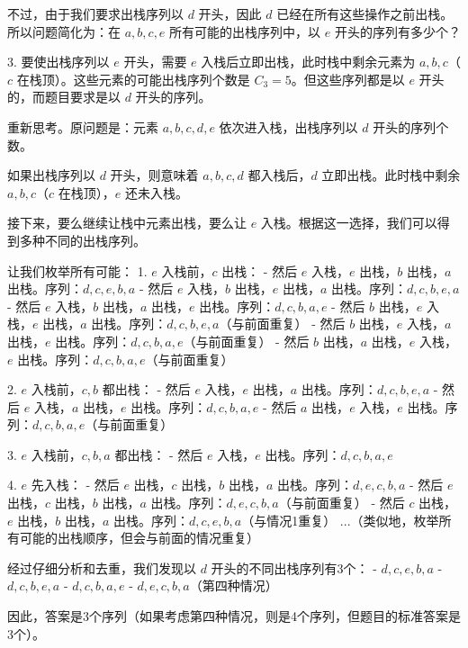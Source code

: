 \documentclass[lang=cn,newtx,10pt,scheme=chinese]{../../../elegantbook}
\begin{document}
\begin{enumerate}
       不过，由于我们要求出栈序列以 $d$ 开头，因此 $d$ 已经在所有这些操作之前出栈。所以问题简化为：在 $a, b, c, e$ 所有可能的出栈序列中，以 $e$ 开头的序列有多少个？

    3. 要使出栈序列以 $e$ 开头，需要 $e$ 入栈后立即出栈，此时栈中剩余元素为 $a, b, c$（$c$ 在栈顶）。这些元素的可能出栈序列个数是 $C_3 = 5$。但这些序列都是以 $e$ 开头的，而题目要求是以 $d$ 开头的序列。

    重新思考。原问题是：元素 $a, b, c, d, e$ 依次进入栈，出栈序列以 $d$ 开头的序列个数。

    如果出栈序列以 $d$ 开头，则意味着 $a, b, c, d$ 都入栈后，$d$ 立即出栈。此时栈中剩余 $a, b, c$（$c$ 在栈顶），$e$ 还未入栈。

    接下来，要么继续让栈中元素出栈，要么让 $e$ 入栈。根据这一选择，我们可以得到多种不同的出栈序列。

    让我们枚举所有可能：
    1. $e$ 入栈前，$c$ 出栈：
       - 然后 $e$ 入栈，$e$ 出栈，$b$ 出栈，$a$ 出栈。序列：$d, c, e, b, a$
       - 然后 $e$ 入栈，$b$ 出栈，$e$ 出栈，$a$ 出栈。序列：$d, c, b, e, a$
       - 然后 $e$ 入栈，$b$ 出栈，$a$ 出栈，$e$ 出栈。序列：$d, c, b, a, e$
       - 然后 $b$ 出栈，$e$ 入栈，$e$ 出栈，$a$ 出栈。序列：$d, c, b, e, a$（与前面重复）
       - 然后 $b$ 出栈，$e$ 入栈，$a$ 出栈，$e$ 出栈。序列：$d, c, b, a, e$（与前面重复）
       - 然后 $b$ 出栈，$a$ 出栈，$e$ 入栈，$e$ 出栈。序列：$d, c, b, a, e$（与前面重复）
       
    2. $e$ 入栈前，$c, b$ 都出栈：
       - 然后 $e$ 入栈，$e$ 出栈，$a$ 出栈。序列：$d, c, b, e, a$
       - 然后 $e$ 入栈，$a$ 出栈，$e$ 出栈。序列：$d, c, b, a, e$
       - 然后 $a$ 出栈，$e$ 入栈，$e$ 出栈。序列：$d, c, b, a, e$（与前面重复）
       
    3. $e$ 入栈前，$c, b, a$ 都出栈：
       - 然后 $e$ 入栈，$e$ 出栈。序列：$d, c, b, a, e$
       
    4. $e$ 先入栈：
       - 然后 $e$ 出栈，$c$ 出栈，$b$ 出栈，$a$ 出栈。序列：$d, e, c, b, a$
       - 然后 $e$ 出栈，$c$ 出栈，$b$ 出栈，$a$ 出栈。序列：$d, e, c, b, a$（与前面重复）
       - 然后 $c$ 出栈，$e$ 出栈，$b$ 出栈，$a$ 出栈。序列：$d, c, e, b, a$（与情况1重复）
       ...（类似地，枚举所有可能的出栈顺序，但会与前面的情况重复）

    经过仔细分析和去重，我们发现以 $d$ 开头的不同出栈序列有3个：
    - $d, c, e, b, a$
    - $d, c, b, e, a$
    - $d, c, b, a, e$
    - $d, e, c, b, a$（第四种情况）

    因此，答案是3个序列（如果考虑第四种情况，则是4个序列，但题目的标准答案是3个）。


\end{enumerate}
\end{document}
